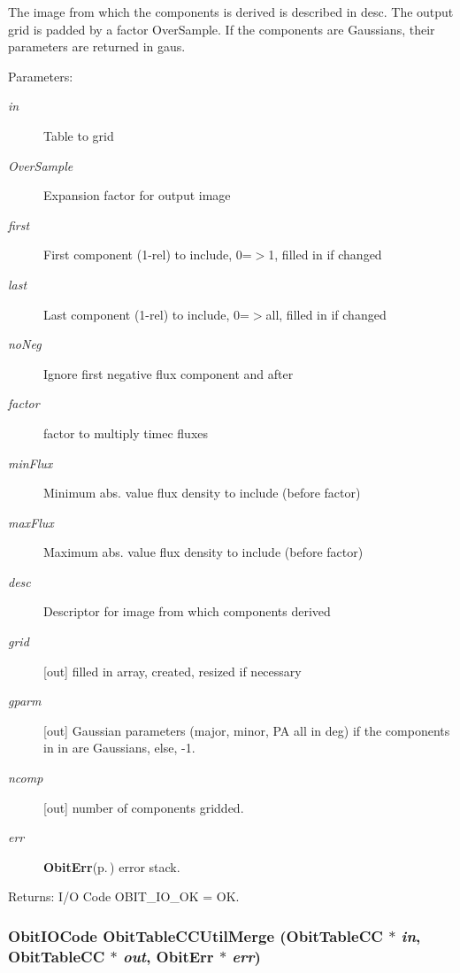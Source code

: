 The image from which the components is derived is described in desc. The output grid is padded by a factor Over\-Sample. If the components are Gaussians, their parameters are returned in gaus. \begin{Desc}
\item[Parameters:]
\begin{description}
\item[{\em in}]Table to grid \item[{\em Over\-Sample}]Expansion factor for output image \item[{\em first}]First component (1-rel) to include, 0=$>$1, filled in if changed \item[{\em last}]Last component (1-rel) to include, 0=$>$all, filled in if changed \item[{\em no\-Neg}]Ignore first negative flux component and after \item[{\em factor}]factor to multiply timec fluxes \item[{\em min\-Flux}]Minimum abs. value flux density to include (before factor) \item[{\em max\-Flux}]Maximum abs. value flux density to include (before factor) \item[{\em desc}]Descriptor for image from which components derived \item[{\em grid}][out] filled in array, created, resized if necessary \item[{\em gparm}][out] Gaussian parameters (major, minor, PA all in deg) if the components in in are Gaussians, else, -1. \item[{\em ncomp}][out] number of components gridded. \item[{\em err}]{\bf Obit\-Err}{\rm (p.\,\pageref{structObitErr})} error stack. \end{description}
\end{Desc}
\begin{Desc}
\item[Returns:]I/O Code OBIT\_\-IO\_\-OK = OK. \end{Desc}
\subsubsection{\setlength{\rightskip}{0pt plus 5cm}Obit\-IOCode Obit\-Table\-CCUtil\-Merge ({\bf Obit\-Table\-CC} $\ast$ {\em in}, {\bf Obit\-Table\-CC} $\ast$ {\em out}, {\bf Obit\-Err} $\ast$ {\em err})}\label{ObitTableCCUtil_8h_a11}


